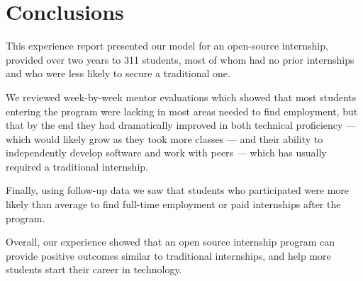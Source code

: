 \section{Conclusions}

This experience report presented our model for an open-source internship, provided over two years to 311 students, most of whom had no prior internships and who were less likely to secure a traditional one.

We reviewed week-by-week mentor evaluations which showed that most students entering the program were lacking in most areas needed to find employment, but that by the end they had dramatically improved in both technical proficiency --- which would likely grow as they took more classes --- and their ability to independently develop software and work with peers --- which has usually required a traditional internship.

Finally, using follow-up data we saw that students who participated were more likely than average to find full-time employment or paid internships after the program.

Overall, our experience showed that an open source internship program can provide positive outcomes similar to traditional internships, and help more students start their career in technology.